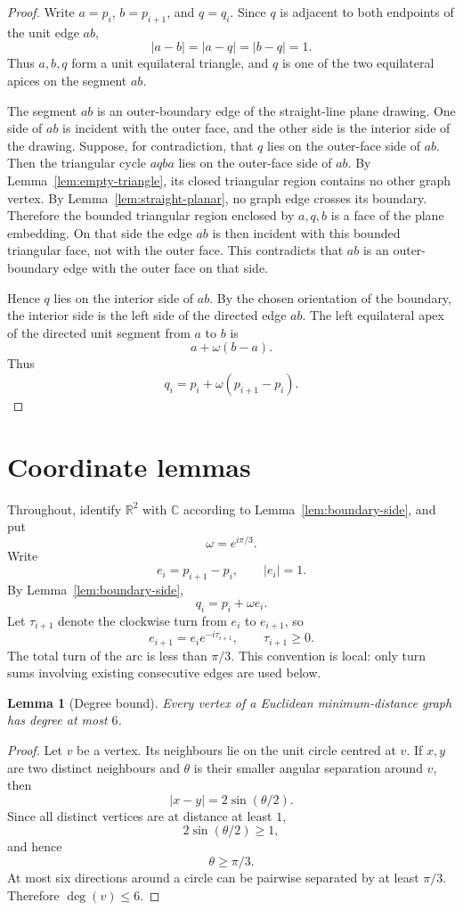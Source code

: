 \documentclass[11pt]{article}
\newtheorem{lemma}[theorem]{Lemma}
\newcommand{\RR}{\mathbb{R}}
\newcommand{\CC}{\mathbb{C}}
\begin{document}
\begin{proof}
Write $a=p_i$, $b=p_{i+1}$, and $q=q_i$. Since $q$ is adjacent to both endpoints of the unit edge $ab$,
\[
 |a-b|=|a-q|=|b-q|=1.
\]
Thus $a,b,q$ form a unit equilateral triangle, and $q$ is one of the two equilateral apices on the segment $ab$.

The segment $ab$ is an outer-boundary edge of the straight-line plane drawing. One side of $ab$ is incident with the outer face, and the other side is the interior side of the drawing. Suppose, for contradiction, that $q$ lies on the outer-face side of $ab$. Then the triangular cycle $a q b a$ lies on the outer-face side of $ab$. By Lemma~\ref{lem:empty-triangle}, its closed triangular region contains no other graph vertex. By Lemma~\ref{lem:straight-planar}, no graph edge crosses its boundary. Therefore the bounded triangular region enclosed by $a,q,b$ is a face of the plane embedding. On that side the edge $ab$ is then incident with this bounded triangular face, not with the outer face. This contradicts that $ab$ is an outer-boundary edge with the outer face on that side.

Hence $q$ lies on the interior side of $ab$. By the chosen orientation of the boundary, the interior side is the left side of the directed edge $ab$. The left equilateral apex of the directed unit segment from $a$ to $b$ is
\[
 a+\omega(b-a).
\]
Thus
\[
 q_i=p_i+\omega(p_{i+1}-p_i).
\]
\end{proof}

\section{Coordinate lemmas}

Throughout, identify $\RR^2$ with $\CC$ according to Lemma~\ref{lem:boundary-side}, and put
\[
 \omega=e^{i\pi/3}.
\]
Write
\[
 e_i=p_{i+1}-p_i,
 \qquad |e_i|=1.
\]
By Lemma~\ref{lem:boundary-side},
\[
 q_i=p_i+\omega e_i.
\]
Let $\tau_{i+1}$ denote the clockwise turn from $e_i$ to $e_{i+1}$, so
\[
 e_{i+1}=e_i e^{-i\tau_{i+1}},
 \qquad \tau_{i+1}\ge0.
\]
The total turn of the arc is less than $\pi/3$. This convention is local: only turn sums involving existing consecutive edges are used below.

\begin{lemma}[Degree bound]\label{lem:degree6}
Every vertex of a Euclidean minimum-distance graph has degree at most $6$.
\end{lemma}

\begin{proof}
Let $v$ be a vertex. Its neighbours lie on the unit circle centred at $v$. If $x,y$ are two distinct neighbours and $\theta$ is their smaller angular separation around $v$, then
\[
 |x-y|=2\sin(\theta/2).
\]
Since all distinct vertices are at distance at least $1$,
\[
 2\sin(\theta/2)\ge1,
\]
and hence
\[
 \theta\ge \pi/3.
\]
At most six directions around a circle can be pairwise separated by at least $\pi/3$. Therefore $\deg(v)\le6$.
\end{proof}
\end{document}
